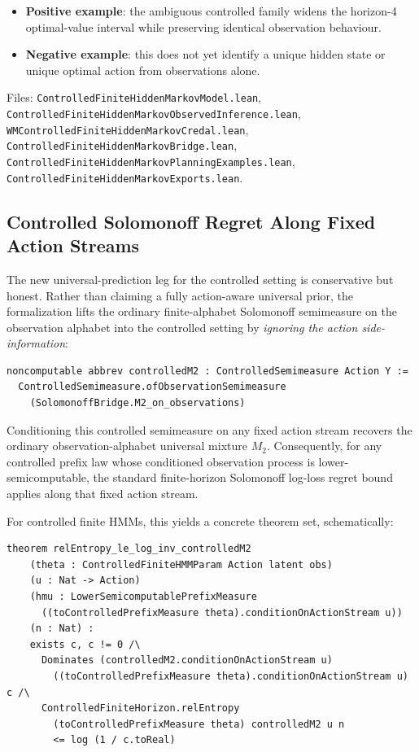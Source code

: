 \documentclass[11pt,a4paper]{article}
\theoremstyle{definition}
\begin{document}
\begin{itemize}
\item \textbf{Positive example}: the ambiguous controlled family widens the
  horizon-4 optimal-value interval while preserving identical observation
  behaviour.
\item \textbf{Negative example}: this does not yet identify a unique hidden
  state or unique optimal action from observations alone.
\end{itemize}

Files:
\texttt{ControlledFiniteHiddenMarkovModel.lean},
\texttt{ControlledFiniteHiddenMarkovObservedInference.lean},
\texttt{WMControlledFiniteHiddenMarkovCredal.lean},
\texttt{ControlledFiniteHiddenMarkovBridge.lean},
\texttt{ControlledFiniteHiddenMarkovPlanningExamples.lean},
\texttt{ControlledFiniteHiddenMarkovExports.lean}.

\subsection{Controlled Solomonoff Regret Along Fixed Action Streams}

The new universal-prediction leg for the controlled setting is conservative but
honest.  Rather than claiming a fully action-aware universal prior, the
formalization lifts the ordinary finite-alphabet Solomonoff semimeasure on the
observation alphabet into the controlled setting by \emph{ignoring the action
side-information}:

\begin{lstlisting}
noncomputable abbrev controlledM2 : ControlledSemimeasure Action Y :=
  ControlledSemimeasure.ofObservationSemimeasure
    (SolomonoffBridge.M2_on_observations)
\end{lstlisting}

Conditioning this controlled semimeasure on any fixed action stream recovers
the ordinary observation-alphabet universal mixture $M_2$.  Consequently, for any
controlled prefix law whose conditioned observation process is
lower-semicomputable, the standard finite-horizon Solomonoff log-loss regret
bound applies along that fixed action stream.

For controlled finite HMMs, this yields a concrete theorem set, schematically:
\begin{lstlisting}
theorem relEntropy_le_log_inv_controlledM2
    (theta : ControlledFiniteHMMParam Action latent obs)
    (u : Nat -> Action)
    (hmu : LowerSemicomputablePrefixMeasure
      ((toControlledPrefixMeasure theta).conditionOnActionStream u))
    (n : Nat) :
    exists c, c != 0 /\
      Dominates (controlledM2.conditionOnActionStream u)
        ((toControlledPrefixMeasure theta).conditionOnActionStream u) c /\
      ControlledFiniteHorizon.relEntropy
        (toControlledPrefixMeasure theta) controlledM2 u n
        <= log (1 / c.toReal)
\end{lstlisting}
\end{document}
